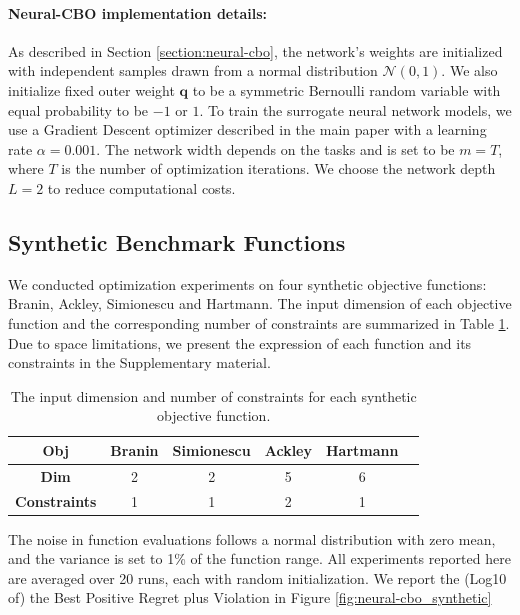 \paragraph{Neural-CBO implementation details:}
As described in Section \ref{section:neural-cbo}, the network's weights are initialized with independent samples drawn from a normal distribution $\mathcal{N} (0, 1)$. We also initialize fixed outer weight $\mathbf{q}$ to be a symmetric Bernoulli random variable with equal probability to be $-1$ or $1$. To train the surrogate neural network models, we use a Gradient Descent optimizer described in the main paper with a learning rate $\alpha = 0.001$. The network width depends on the tasks and is set to be $m = T$, where $T$ is the number of optimization iterations. We choose the network depth $L=2$ to reduce computational costs. 

\subsection{Synthetic Benchmark Functions}
\label{section:neural-cbo_synthetic}
We conducted optimization experiments on four synthetic objective functions: Branin, Ackley, Simionescu and Hartmann. The input dimension of each objective function and the corresponding number of constraints are summarized in Table \ref{table:synthetic_info}. Due to space limitations, we present the expression of each function and its constraints in the Supplementary material. 
  \begin{table}[h]
  \centering
 \caption{The input dimension and number of constraints for each synthetic objective function.}
 \vspace{0.15in}
\begin{tabular}{|c|c|c|c|c|c|}
\hline
\textbf{Obj}              & Branin & Simionescu & Ackley & Hartmann  \\ \hline
\textbf{Dim}                   & 2   & 2               & 5 & 6                  \\ \hline
\textbf{Constraints}       & 1      & 1              & 2       & 1          \\ \hline
\end{tabular}
\label{table:synthetic_info}
\end{table}
The noise in function evaluations follows a normal distribution with zero mean, and the variance is set to 1\% of the function range. All experiments reported here are averaged over 20 runs, each with random initialization. We report the (Log10 of) the Best Positive Regret plus Violation in Figure \ref{fig:neural-cbo_synthetic}

